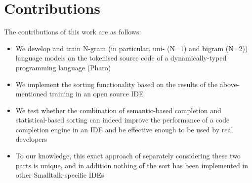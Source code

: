 \section{Contributions}
The contributions of this work are as follows:
\begin{itemize}
    \item We develop and train N-gram (in particular, uni- (N=1) and bigram (N=2)) language models on the tokenised source code of a dynamically-typed programming language (Pharo)
    \item We implement the sorting functionality based on the results of the above-mentioned training in an open source IDE
    \item We test whether the combination of semantic-based completion and statistical-based sorting can indeed improve the performance of a code completion engine in an IDE and be effective enough to be used by real developers
    \item To our knowledge, this exact approach of separately considering these two parts is unique, and in addition nothing of the sort has been implemented in other Smalltalk-specific IDEs
\end{itemize}

